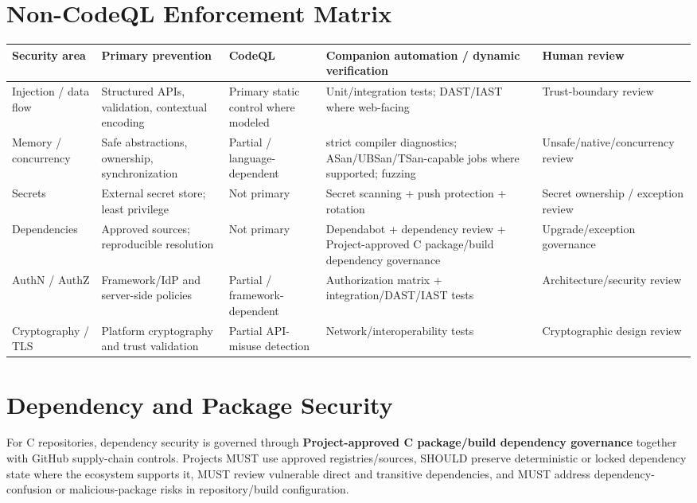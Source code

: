\documentclass[10pt,letterpaper]{article}
\begin{document}
\section{Non-CodeQL Enforcement Matrix}
\begin{tabularx}{\textwidth}{@{}P{1.22in}Y P{1.55in} P{1.55in} P{1.5in}@{}}
\toprule
\textbf{Security area} & \textbf{Primary prevention} & \textbf{CodeQL} & \textbf{Companion automation / dynamic verification} & \textbf{Human review}\\
\midrule
Injection / data flow & Structured APIs, validation, contextual encoding & Primary static control where modeled & Unit/integration tests; DAST/IAST where web-facing & Trust-boundary review\\
Memory / concurrency & Safe abstractions, ownership, synchronization & Partial / language-dependent & strict compiler diagnostics; ASan/UBSan/TSan-capable jobs where supported; fuzzing & Unsafe/native/concurrency review\\
Secrets & External secret store; least privilege & Not primary & Secret scanning + push protection + rotation & Secret ownership / exception review\\
Dependencies & Approved sources; reproducible resolution & Not primary & Dependabot + dependency review + Project-approved C package/build dependency governance & Upgrade/exception governance\\
AuthN / AuthZ & Framework/IdP and server-side policies & Partial / framework-dependent & Authorization matrix + integration/DAST/IAST tests & Architecture/security review\\
Cryptography / TLS & Platform cryptography and trust validation & Partial API-misuse detection & Network/interoperability tests & Cryptographic design review\\
\bottomrule
\end{tabularx}

\section{Dependency and Package Security}
For C repositories, dependency security is governed through \textbf{Project-approved C package/build dependency governance} together with GitHub supply-chain controls. Projects MUST use approved registries/sources, SHOULD preserve deterministic or locked dependency state where the ecosystem supports it, MUST review vulnerable direct and transitive dependencies, and MUST address dependency-confusion or malicious-package risks in repository/build configuration.
\end{document}
